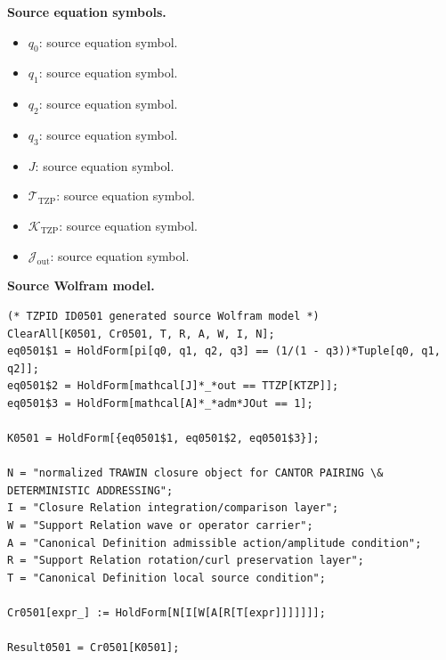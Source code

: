 \begin{minipage}[t]{0.49\linewidth}
\begingroup
\small
\raggedright
\textbf{Source equation symbols.}\par
\begin{itemize}[leftmargin=1.35em,itemsep=1pt,topsep=1pt,parsep=0pt]
    \item $q_0$: source equation symbol.
    \item $q_1$: source equation symbol.
    \item $q_2$: source equation symbol.
    \item $q_3$: source equation symbol.
    \item $J$: source equation symbol.
    \item $\mathcal{T}_{\mathrm{TZP}}$: source equation symbol.
    \item $\mathcal{K}_{\mathrm{TZP}}$: source equation symbol.
    \item $\mathcal{J}_{\mathrm{out}}$: source equation symbol.
\end{itemize}
\endgroup
\end{minipage}\hfill
\begin{minipage}[t]{0.47\linewidth}
\begingroup
\scriptsize
\raggedright
\textbf{Source Wolfram model.}\par
\begin{Verbatim}[fontsize=\tiny,breaklines=true,breakanywhere=true]
(* TZPID ID0501 generated source Wolfram model *)
ClearAll[K0501, Cr0501, T, R, A, W, I, N];
eq0501$1 = HoldForm[pi[q0, q1, q2, q3] == (1/(1 - q3))*Tuple[q0, q1, q2]];
eq0501$2 = HoldForm[mathcal[J]*_*out == TTZP[KTZP]];
eq0501$3 = HoldForm[mathcal[A]*_*adm*JOut == 1];

K0501 = HoldForm[{eq0501$1, eq0501$2, eq0501$3}];

N = "normalized TRAWIN closure object for CANTOR PAIRING \& DETERMINISTIC ADDRESSING";
I = "Closure Relation integration/comparison layer";
W = "Support Relation wave or operator carrier";
A = "Canonical Definition admissible action/amplitude condition";
R = "Support Relation rotation/curl preservation layer";
T = "Canonical Definition local source condition";

Cr0501[expr_] := HoldForm[N[I[W[A[R[T[expr]]]]]]];

Result0501 = Cr0501[K0501];
\end{Verbatim}
\endgroup
\end{minipage}

